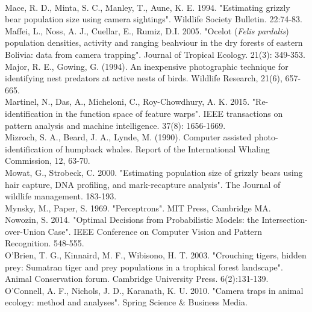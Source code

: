 \documentclass[11pt]{article}
\begin{document}
\newline
\\
Mace, R. D., Minta, S. C., Manley, T., Aune, K. E. 1994. "Estimating grizzly bear population size using camera sightings". Wildlife Society Bulletin. 22:74-83.
\newline
\\
Maffei, L., Noss, A. J., Cuellar, E., Rumiz, D.I. 2005. "Ocelot (\textit{Felis pardalis}) population densities, activity and ranging beahviour in the dry forests of eastern Bolivia: data from camera trapping". Journal of Tropical Ecology. 21(3): 349-353.
\newline
\\
Major, R. E., Gowing, G. (1994). An inexpensive photographic technique for identifying nest predators at active nests of birds. Wildlife Research, 21(6), 657-665.
\newline
\\
Martinel, N., Das, A., Micheloni, C., Roy-Chowdhury, A. K. 2015. "Re-identification in the function space of feature warps". IEEE transactions on pattern analysis and machine intelligence. 37(8): 1656-1669.
\newline
\\
Mizroch, S. A., Beard, J. A., Lynde, M. (1990). Computer assisted photo-identification of humpback whales. Report of the International Whaling Commission, 12, 63-70.
\newline
\\
Mowat, G., Strobeck, C. 2000. "Estimating population size of grizzly bears using hair capture, DNA profiling, and mark-recapture analysis". The Journal of wildlife management. 183-193.
\newline
\\
Mynsky, M., Paper, S. 1969. "Perceptrons". MIT Press, Cambridge MA. 
\newline
\\
Nowozin, S. 2014. "Optimal Decisions from Probabilistic Models: the Intersection-over-Union Case". IEEE Conference on Computer Vision and Pattern Recognition. 548-555.
\newline
\\
O'Brien, T. G., Kinnaird, M. F., Wibisono, H. T. 2003. "Crouching tigers, hidden prey: Sumatran tiger and prey populations in a trophical forest landscape". Animal Conservation forum. Cambridge University Press. 6(2):131-139.
\newline
\\
O'Connell, A. F., Nichols, J. D., Karanath, K. U. 2010. "Camera traps in animal ecology: method and analyses". Spring Science \& Business Media.
\end{document}

